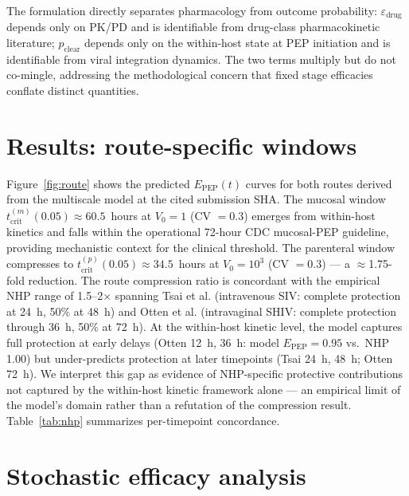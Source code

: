 \documentclass[10pt,letterpaper]{article}
\theoremstyle{definition}
\theoremstyle{remark}
\newcommand{\Epep}{E_{\text{PEP}}}
\newcommand{\tcrit}{t_{\text{crit}}}
\begin{document}
The formulation directly separates pharmacology from outcome probability: $\varepsilon_{\text{drug}}$ depends only on PK/PD and is identifiable from drug-class pharmacokinetic literature; $p_{\text{clear}}$ depends only on the within-host state at PEP initiation and is identifiable from viral integration dynamics. The two terms multiply but do not co-mingle, addressing the methodological concern that fixed stage efficacies conflate distinct quantities.


\section*{Results: route-specific windows}

Figure~\ref{fig:route} shows the predicted $\Epep(t)$ curves for both routes derived from the multiscale model at the cited submission SHA. The mucosal window $\tcrit^{(m)}(0.05) \approx 60.5$~hours at $V_{0} = 1$ (CV $= 0.3$) emerges from within-host kinetics and falls within the operational 72-hour CDC mucosal-PEP guideline\cite{tanner2025}, providing mechanistic context for the clinical threshold. The parenteral window compresses to $\tcrit^{(p)}(0.05) \approx 34.5$~hours at $V_{0} = 10^{3}$ (CV $= 0.3$) --- a $\approx$1.75-fold reduction. The route compression ratio is concordant with the empirical NHP range of 1.5--2$\times$ spanning Tsai et al.\cite{tsai1995} (intravenous SIV: complete protection at 24~h, 50\% at 48~h) and Otten et al.\cite{otten2000} (intravaginal SHIV: complete protection through 36~h, 50\% at 72~h). At the within-host kinetic level, the model captures full protection at early delays (Otten 12~h, 36~h: model $\Epep = 0.95$ vs.\ NHP 1.00) but under-predicts protection at later timepoints (Tsai 24~h, 48~h; Otten 72~h). We interpret this gap as evidence of NHP-specific protective contributions not captured by the within-host kinetic framework alone --- an empirical limit of the model's domain rather than a refutation of the compression result. Table~\ref{tab:nhp} summarizes per-timepoint concordance.


\section*{Stochastic efficacy analysis}
\end{document}
